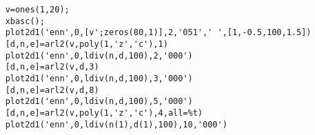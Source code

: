 \begin{examples}
  \begin{Verbatim}
    v=ones(1,20);
    xbasc();
    plot2d1('enn',0,[v';zeros(80,1)],2,'051',' ',[1,-0.5,100,1.5])
    [d,n,e]=arl2(v,poly(1,'z','c'),1)
    plot2d1('enn',0,ldiv(n,d,100),2,'000')
    [d,n,e]=arl2(v,d,3)
    plot2d1('enn',0,ldiv(n,d,100),3,'000')
    [d,n,e]=arl2(v,d,8)
    plot2d1('enn',0,ldiv(n,d,100),5,'000')
    [d,n,e]=arl2(v,poly(1,'z','c'),4,all=%t)
    plot2d1('enn',0,ldiv(n(1),d(1),100),10,'000')
  \end{Verbatim}
\end{examples}
\begin{manseealso}
\end{manseealso}

